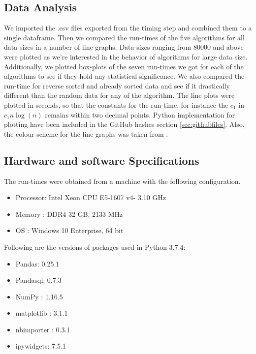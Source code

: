 \documentclass[sigconf, nonacm, natbib, screen, balance=False]{acmart}
\begin{document}
\subsection{Data Analysis}\label{sec:analysis}
We imported the .csv files exported from the timing step and combined them to a single dataframe. Then we compared the run-times of the five algorithms for all data sizes in a number of line graphs. Data-sizes ranging from 80000 and above were plotted as we're interested in the behavior of algorithms for large data size.\newline
Additionally, we plotted box-plots of the seven run-times we got for each of the algorithms to see if they hold any statistical significance. We also compared the run-time for reverse sorted and already sorted data and see if it drastically different than the random data for any of the algorithm. The line plots were plotted in seconds, so that the constants for the run-time, for instance the $c_1$ in  $c_1n\log\left(n\right)$ remains within two decimal points.\newline
Python implementation for plotting have been included in the GitHub hashes section \ref{sec:githubfiles}. Also, the colour scheme for the line graphs was taken from \citet{colorcombo}.

\subsection{Hardware and software Specifications}\label{sec:hardwares and softwares}
The run-times were obtained from a machine with the following configuration. 

\begin{itemize}
\item Processor:    Intel Xeon CPU E5-1607 v4- 3.10 GHz
\item Memory :      DDR4 32 GB, 2133 MHz
\item OS :          Windows 10 Enterprise, 64 bit
\end{itemize}


Following are the versions of packages used in Python 3.7.4:
\begin{multicols}{2}
\begin{itemize}
\item Pandas:    0.25.1
\item Pandasql:    0.7.3
\item NumPy :      1.16.5
\item matplotlib :   3.1.1
\item nbimporter :  0.3.1
\item ipywidgets: 7.5.1
\end{itemize}
\end{multicols}
\end{document}
